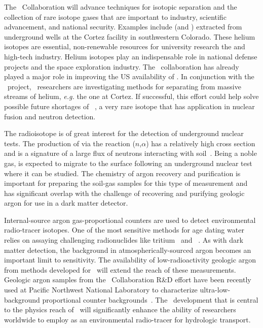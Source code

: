 The \GADMC\ Collaboration will advance techniques for isotopic separation and the collection of rare isotope gases that are important to industry, scientific advancement, and national security.  Examples include  (and ) extracted from underground  wells at the Cortez facility in southwestern Colorado.  These helium isotopes are essential, non-renewable resources for university research the and high-tech industry.  Helium isotopes play an indispensable role in national defense projects and the space exploration industry.  The \GADMC\ collaboration has already played a major role in improving the US availability of .  In conjunction with the \Urania\ project, \DSs\ researchers are investigating methods for separating  from massive streams of helium, {\it e.g.} the one at Cortez.  If successful, this effort could help solve possible future shortages of ~\cite{Shea:2010vz}, a very rare isotope that has application in nuclear fusion and neutron detection.

The  radioisotope is of great interest for the detection of underground nuclear tests.  The production of  via the reaction ($n$,$\alpha$) has a relatively high cross section and is a signature of a large flux of neutrons interacting with soil~\cite{Riedmann:2011ht}.  Being a noble gas,  is expected to migrate to the surface following an underground nuclear test where it can be studied.  The chemistry of argon recovery and purification is important for preparing the soil-gas samples for this type of measurement and has significant overlap with the challenge of recovering and purifying geologic argon for use in a dark matter detector.  

Internal-source argon gas-proportional counters are used to detect environmental radio-tracer isotopes.  One of the most sensitive methods for age dating water relies on assaying challenging radionuclides like tritium~\cite{Theodorsson:1999dn} and ~\cite{Martoff:1992bg}.  As with dark matter detection, the  background in atmospherically-sourced argon becomes an important limit to sensitivity. The availability of low-radioactivity geologic argon from methods developed for \DSs\ will extend the reach of these measurements. Geologic argon samples from the \GADMC\ Collaboration R\&D effort have been recently used at Pacific Northwest National Laboratory to characterize ultra-low-background proportional counter backgrounds~\cite{Aalseth:2009je,Seifert:2012ip}.  The \UAr\ development that is central to the physics reach of \DSs\ will significantly enhance the ability of researchers worldwide to employ  as an environmental radio-tracer for hydrologic transport.

